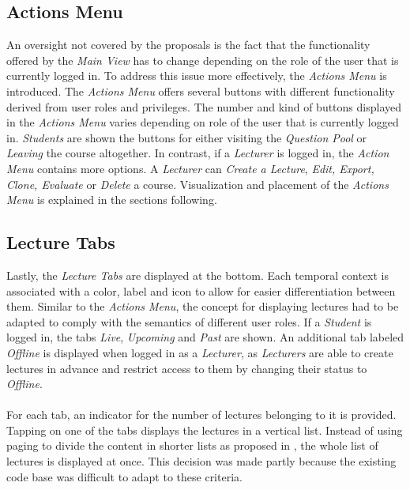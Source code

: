 \subsection{Actions Menu}
An oversight not covered by the proposals is the fact that the functionality offered by the \emph{Main View} has to change depending on the role of the user that is currently logged in. To address this issue more effectively, the \emph{Actions Menu} is introduced.
The \emph{Actions Menu} offers several buttons with different functionality derived from user roles and privileges.
The number and kind of buttons displayed in the \emph{Actions Menu} varies depending on role of the user that is currently logged in. \emph{Students} are shown the buttons for either visiting the \emph{Question Pool} or \emph{Leaving} the course altogether. In contrast, if a \emph{Lecturer} is logged in, the \emph{Action Menu} contains more options. A \emph{Lecturer} can \emph{Create a Lecture}, \emph{Edit, Export, Clone, Evaluate } or \emph{Delete} a course. Visualization and placement of the \emph{Actions Menu} is explained in the sections following.


\subsection{Lecture Tabs}
Lastly, the \emph{Lecture Tabs} are displayed at the bottom. Each temporal context is associated with a color, label and icon to allow for easier differentiation between them. Similar to the \emph{Actions Menu}, the concept for displaying lectures had to be adapted to comply with the semantics of different user roles.
If a \emph{Student} is logged in, the tabs \emph{Live}, \emph{Upcoming} and \emph{Past} are shown. An additional tab labeled \emph{Offline} is displayed when logged in as a \emph{Lecturer}, as \emph{Lecturers} are able to create lectures in advance and restrict access to them by changing their status to \emph{Offline}.
\\
\\
For each tab, an indicator for the number of lectures belonging to it is provided.
Tapping on one of the tabs displays the lectures in a vertical list. Instead of using paging to divide the content in shorter lists as proposed in , the whole list of lectures is displayed at once.
This decision was made partly because the existing code base was difficult to adapt to these criteria.


